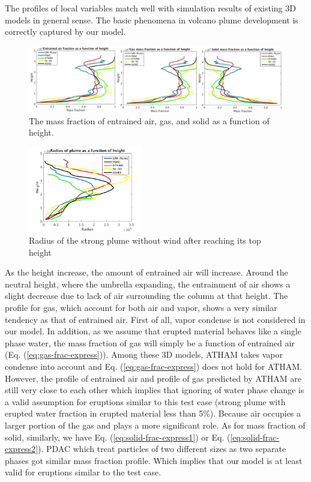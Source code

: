 \documentclass[journal abbreviation, manuscript]{copernicus}
\begin{document}
The profiles of local variables match well with simulation results of existing 3D models in general sense. The basic phenomena in volcano plume development is correctly captured by our model.
%
\begin{figure}
\includegraphics[width=15cm]{msfrac}
\caption{The mass fraction of entrained air, gas, and solid as a function of height.}
\label{fig:strong_plume_mass_fraction}
\end{figure}
%
%
\begin{figure}
\center
\includegraphics[width=5cm]{radius_strong}
\caption{Radius of the strong plume without wind after reaching its top height}
\label{fig:strong_local_radius}
\end{figure}
%
As the height increase, the amount of entrained air will increase. Around the neutral height, where the umbrella expanding, the entrainment of air shows a slight decrease due to lack of air surrounding the column at that height. The profile for gas, which account for both air and vapor, shows a very similar tendency as that of entrained air. First of all, vapor condense is not considered in our model. In addition, as we assume that erupted material behaves like a single phase water, the mass fraction of gas will simply be a function of entrained air (Eq. (\ref{eq:gas-frac-express})). Among these 3D models, ATHAM takes vapor condense into account and Eq. (\ref{eq:gas-frac-express}) does not hold for ATHAM. However, the profile of entrained air and profile of gas predicted by ATHAM are still very close to each other which implies that ignoring of water phase change is a valid assumption for eruptions similar to this test case (strong plume with erupted water fraction in erupted material less than 5\%). Because air occupies a larger portion of the gas and plays a more significant role. As for mass fraction of solid, similarly, we have Eq. (\ref{eq:solid-frac-express1}) or Eq. (\ref{eq:solid-frac-express2}). PDAC which treat particles of two different sizes as two separate phases got similar mass fraction profile. Which implies that our model is at least valid for eruptions similar to the test case. 
\end{document}
